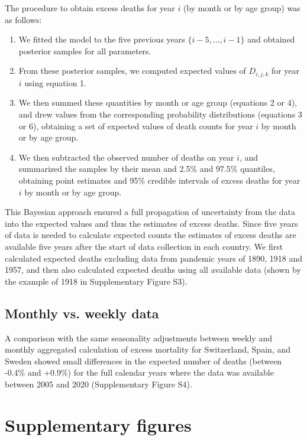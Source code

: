 \documentclass{article}
\begin{document}
	The procedure to obtain excess deaths for year $i$ (by month or by age group) was as follows:
	\begin{enumerate}
		\item We fitted the model to the five previous years $\{i-5,\ldots,i-1\}$ and obtained posterior samples for all parameters.
		\item From these posterior samples, we computed expected values of $D_{i,j,k}$ for year $i$ using equation 1.
		\item We then summed these quantities by month or age group (equations 2 or 4), and drew values from the corresponding probability distributions (equations 3 or 6), obtaining a set of expected values of death counts for year $i$ by month or by age group. 
		\item We then subtracted the observed number of deaths on year $i$, and summarized the samples by their mean and 2.5\% and 97.5\% quantiles, obtaining point estimates and 95\% credible intervals of excess deaths for year $i$ by month or by age group. 
	\end{enumerate} 
	This Bayesian approach ensured a full propagation of uncertainty from the data into the expected values and thus the estimates of excess deaths.
	Since five years of data is needed to calculate expected counts the estimates of excess deaths are available five years after the start of data collection in each country. We first calculated expected deaths excluding data from pandemic years of 1890, 1918 and 1957, and then also calculated expected deaths using all available data (shown by the example of 1918 in Supplementary Figure S3).

	\subsection{Monthly vs. weekly data}
	
	A comparison with the same seasonality adjustments between weekly and monthly aggregated calculation of excess mortality for Switzerland, Spain, and Sweden showed small differences in the expected number of deaths (between -0.4\% and +0.9\%) for the full calendar years where the data was available between 2005 and 2020 (Supplementary Figure S4).	
	
	\section{Supplementary figures}
	
\end{document}
